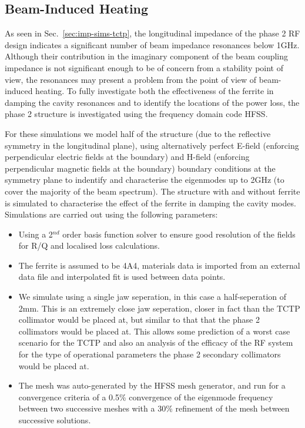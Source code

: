 \subsection{Beam-Induced Heating}
\label{sec:beam-heating-tctp}

As seen in Sec.~\ref{sec:imp-sims-tctp}, the longitudinal impedance of the phase 2 RF design indicates a significant number of beam impedance resonances below 1GHz. Although their contribution in the imaginary component of the beam coupling impedance is not significant enough to be of concern from a stability point of view, the resonances may present a problem from the point of view of beam-induced heating. To fully investigate both the effectiveness of the ferrite in damping the cavity resonances and to identify the locations of the power loss, the phase 2 structure is investigated using the frequency domain code HFSS. 

For these simulations we model half of the structure (due to the reflective symmetry in the longitudinal plane), using alternatively perfect E-field (enforcing perpendicular electric fields at the boundary) and H-field (enforcing perpendicular magnetic fields at the boundary) boundary conditions at the symmetry plane to indentify and characterise the eigenmodes up to 2GHz (to cover the majority of the beam spectrum). The structure with and without ferrite is simulated to characterise the effect of the ferrite in damping the cavity modes. Simulations are carried out using the following parameters:

\begin{itemize}
\item{Using a 2$^{nd}$ order basis function solver to ensure good resolution of the fields for R/Q and localised loss calculations.}
\item{The ferrite is assumed to be 4A4, materials data is imported from an external data file and interpolated fit is used between data points.}
\item{We simulate using a single jaw seperation, in this case a half-seperation of 2mm. This is an extremely close jaw seperation, closer in fact than the TCTP collimator would be placed at, but similar to that that the phase 2 collimators would be placed at. This allows some prediction of a worst case scenario for the TCTP and also an analysis of the efficacy of the RF system for the type of operational parameters the phase 2 secondary collimators would be placed at.}
\item{The mesh was auto-generated by the HFSS mesh generator, and run for a convergence criteria of a 0.5\% convergence of the eigenmode frequency between two successive meshes with a 30\% refinement of the mesh between successive solutions.}
\end{itemize}

